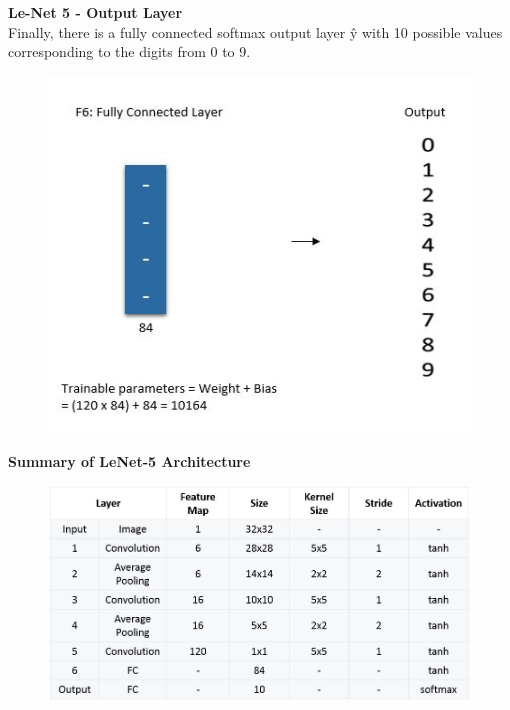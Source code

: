 \documentclass[10pt, compress]{beamer}
\begin{document}
\begin{frame}
  \vspace{0.6cm}
  \textbf{Le-Net 5 - Output Layer} \\
  Finally, there is a fully connected softmax output layer ŷ with 10 possible values corresponding to the digits from 0 to 9.
  \begin{figure}
    \includegraphics[width=.65\linewidth]{imgs/cnn/LeNet_Output_Layer}
  \end{figure}
\end{frame}

\begin{frame}
  \vspace{0.6cm}
  \textbf{Summary of LeNet-5 Architecture} \\
  \begin{figure}
    \includegraphics[width=.75\linewidth]{imgs/cnn/LeNEt_Summary_Table}
  \end{figure}
\end{frame}
\end{document}
